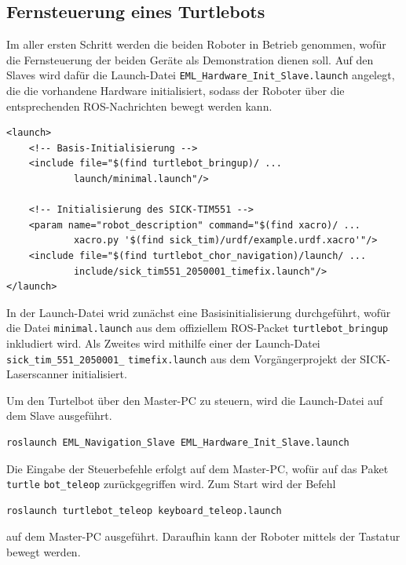 \subsection{Fernsteuerung eines Turtlebots}
Im aller ersten Schritt werden die beiden Roboter in Betrieb genommen, wofür die Fernsteuerung der beiden Geräte als Demonstration dienen soll. Auf den Slaves wird dafür die Launch-Datei \lstinline{EML_Hardware_Init_Slave.launch}{} angelegt, die die vorhandene Hardware initialisiert, sodass der Roboter über die entsprechenden ROS-Nachrichten bewegt werden kann.
\begin{lstlisting}[caption={EML\_Hardware\_Init\_Slave.launch},captionpos=b]
<launch>
	<!-- Basis-Initialisierung -->
	<include file="$(find turtlebot_bringup)/ ...
			launch/minimal.launch"/>
	
	<!-- Initialisierung des SICK-TIM551 -->
	<param name="robot_description" command="$(find xacro)/ ...
			xacro.py '$(find sick_tim)/urdf/example.urdf.xacro'"/>
	<include file="$(find turtlebot_chor_navigation)/launch/ ...
			include/sick_tim551_2050001_timefix.launch"/>
</launch>
\end{lstlisting}
In der Launch-Datei wrid zunächst eine Basisinitialisierung durchgeführt, wofür die Datei \lstinline{minimal.launch}{} aus dem offiziellem ROS-Packet \lstinline{turtlebot_bringup}{}\cite{WikiTurtlebotBringup} inkludiert wird. Als Zweites wird mithilfe einer der Launch-Datei \lstinline{sick_tim_551_2050001_} \lstinline{timefix.launch}{} aus dem Vorgängerprojekt \cite{Turtleboys} der SICK-Laserscanner initialisiert.

Um den Turtelbot über den Master-PC zu steuern, wird die Launch-Datei auf dem Slave ausgeführt.
\begin{lstlisting}[language=bash]
roslaunch EML_Navigation_Slave EML_Hardware_Init_Slave.launch
\end{lstlisting}
Die Eingabe der Steuerbefehle erfolgt auf dem Master-PC, wofür auf das Paket \lstinline{turtle}{} \lstinline{bot_teleop}{} \cite{WikiTurtlebotTeleop} zurückgegriffen wird. Zum Start wird der Befehl
\begin{lstlisting}
roslaunch turtlebot_teleop keyboard_teleop.launch
\end{lstlisting}
auf dem Master-PC ausgeführt. Daraufhin kann der Roboter mittels der Tastatur bewegt werden.

\newpage
